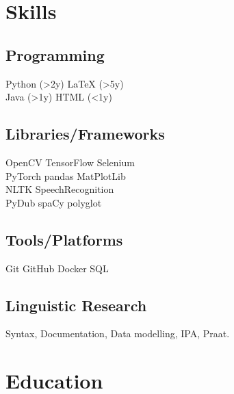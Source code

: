 \documentclass[]{plushcv}
\begin{document}
\begin{minipage}[t]{0.70\textwidth}
%
%

\end{minipage} 
\hfill
\begin{minipage}[t]{0.25\textwidth} 


\section{Skills}
\subsection{Programming}
\sectionsep
{} 
Python (>2y) \textbullet{} LaTeX (>5y)  \\
\sectionsep
{}
Java (>1y) \textbullet{}  HTML (<1y) \\
\sectionsep
\subsection{Libraries/Frameworks}
\sectionsep
OpenCV \textbullet{} TensorFlow \textbullet{} Selenium\\
PyTorch \textbullet{} pandas \textbullet{} MatPlotLib \\
NLTK \textbullet{} SpeechRecognition \textbullet{} \\ 
PyDub \textbullet{} spaCy \textbullet{} polyglot
\sectionsep
\subsection{Tools/Platforms}
\sectionsep
Git \textbullet{} GitHub \textbullet{} Docker \textbullet{} SQL \\
\sectionsep
\subsection{Linguistic Research}
\sectionsep
Syntax, Documentation, Data modelling, IPA, Praat.
\sectionsep


\section{Education} 


\end{minipage}
\end{document}
